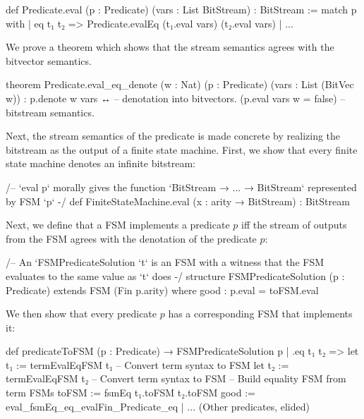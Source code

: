 \begin{lean}
def Predicate.eval (p : Predicate) (vars : List BitStream) : BitStream :=
  match p with
  | eq t₁ t₂ => Predicate.evalEq (t₁.eval vars) (t₂.eval vars)
  | ...
\end{lean}

We prove a theorem which shows that the stream semantics agrees with the bitvector semantics.
\begin{lean}
theorem Predicate.eval_eq_denote (w : Nat) (p : Predicate) (vars : List (BitVec w)) :
    p.denote w vars ↔ -- denotation into bitvectors.
    (p.eval vars w = false) -- bitstream semantics.
\end{lean}

Next, the stream semantics of the predicate is made concrete by realizing the bitstream
as the output of a finite state machine. First, we show that every finite state machine denotes an infinite bitstream:

\begin{lean}
/-- `eval p` morally gives the function
  `BitStream → ... → BitStream` represented by FSM `p` -/
def FiniteStateMachine.eval (x : arity → BitStream) : BitStream
\end{lean}

Next, we define that a FSM implements a predicate $p$ iff the stream of outputs
from the FSM agrees with the denotation of the predicate $p$:

\begin{lean}
/-- An `FSMPredicateSolution `t` is an FSM with a witness
    that the FSM evaluates to the same value as `t` does -/
structure FSMPredicateSolution (p : Predicate) extends FSM (Fin p.arity) where
    good : p.eval = toFSM.eval
\end{lean}

We then show that every predicate $p$ has a corresponding FSM that implements it:

\begin{lean}
def predicateToFSM (p : Predicate) → FSMPredicateSolution p
  | .eq t₁ t₂ =>
    let t₁ := termEvalEqFSM t₁ -- Convert term syntax to FSM
    let t₂ := termEvalEqFSM t₂ -- Convert term syntax to FSM
    {
     -- Build equality FSM from term FSMs
     toFSM := fsmEq t₁.toFSM t₂.toFSM
     good := eval_fsmEq_eq_evalFin_Predicate_eq
    }
  | ... (Other predicates, elided)
\end{lean}

